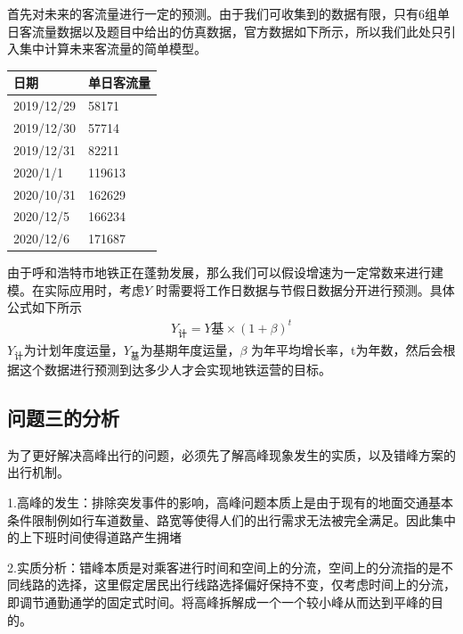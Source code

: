 \documentclass[12pt,a4paper]{mcmthesis}
\begin{document}
        {首先对未来的客流量进行一定的预测。由于我们可收集到的数据有限，只有6组单日客流量数据以及题目中给出的仿真数据，官方数据如下所示，所以我们此处只引入集中计算未来客流量的简单模型。}
    \begin{table}
        \centering
        \begin{tabular}{|l|l|}
            \hline
            日期         & 单日客流量  \\ \hline
            2019/12/29 & 58171  \\ \hline
            2019/12/30 & 57714  \\ \hline
            2019/12/31 & 82211  \\ \hline
            2020/1/1   & 119613 \\ \hline
            2020/10/31 & 162629 \\ \hline
            2020/12/5  & 166234 \\ \hline
            2020/12/6  & 171687 \\ \hline
        \end{tabular}
    \end{table}
    由于呼和浩特市地铁正在蓬勃发展，那么我们可以假设增速为一定常数来进行建模。在实际应用时，考虑$Y$ 时需要将工作日数据与节假日数据分开进行预测。具体公式如下所示
    \begin{equation}
        \begin{aligned}
            Y_{计}=Y{基} \times (1+\beta)^t
        \end{aligned}
    \end{equation}
    $Y_{计}$为计划年度运量，$Y_{基}$为基期年度运量，$\beta$ 为年平均增长率，t为年数，然后会根据这个数据进行预测到达多少人才会实现地铁运营的目标。

    \subsection{问题三的分析}

    为了更好解决高峰出行的问题，必须先了解高峰现象发生的实质，以及错峰方案的出行机制。

    1.高峰的发生：排除突发事件的影响，高峰问题本质上是由于现有的地面交通基本条件限制例如行车道数量、路宽等使得人们的出行需求无法被完全满足。因此集中的上下班时间使得道路产生拥堵

    2.实质分析：错峰本质是对乘客进行时间和空间上的分流，空间上的分流指的是不同线路的选择，这里假定居民出行线路选择偏好保持不变，仅考虑时间上的分流，即调节通勤通学的固定式时间。将高峰拆解成一个一个较小峰从而达到平峰的目的。
\end{document}

